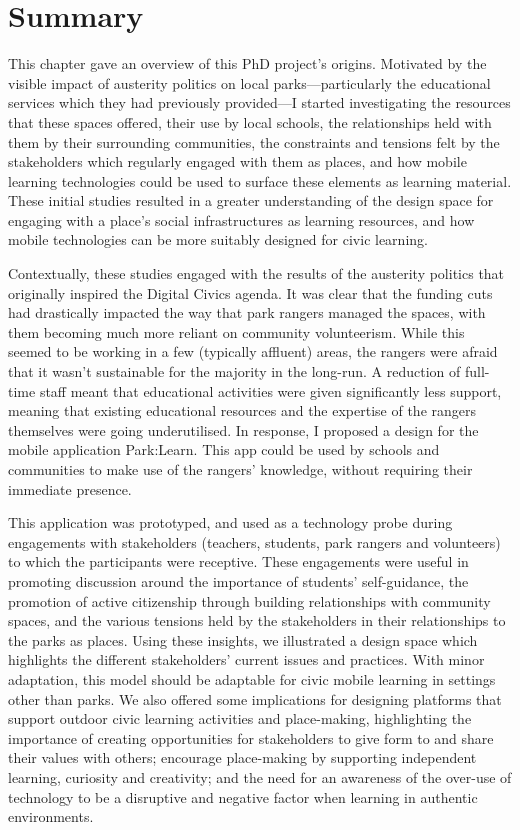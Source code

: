 \section{Summary}

This chapter gave an overview of this PhD project's origins. Motivated by the visible impact of austerity politics on local parks---particularly the educational services which they had previously provided---I started investigating the resources that these spaces offered, their use by local schools, the relationships held with them by their surrounding communities, the constraints and tensions felt by the stakeholders which regularly engaged with them as places, and how mobile learning technologies could be used to surface these elements as learning material. These initial studies resulted in a greater understanding of the design space for engaging with a place's social infrastructures as learning resources, and how mobile technologies can be more suitably designed for civic learning.

Contextually, these studies engaged with the results of the austerity politics that originally inspired the Digital Civics agenda. It was clear that the funding cuts had drastically impacted the way that park rangers managed the spaces, with them becoming much more reliant on community volunteerism. While this seemed to be working in a few (typically affluent) areas, the rangers were afraid that it wasn't sustainable for the majority in the long-run. A reduction of full-time staff meant that educational activities were given significantly less support, meaning that existing educational resources and the expertise of the rangers themselves were going underutilised. In response, I proposed a design for the mobile application Park:Learn. This app could be used by schools and communities to make use of the rangers' knowledge, without requiring their immediate presence.

This application was prototyped, and used as a technology probe during engagements with stakeholders (teachers, students, park rangers and volunteers) to which the participants were receptive. These engagements were useful in promoting discussion around the importance of students' self-guidance, the promotion of active citizenship through building relationships with community spaces, and the various tensions held by the stakeholders in their relationships to the parks as places. Using these insights, we illustrated a design space which highlights the different stakeholders’ current issues and practices. With minor adaptation, this model should be adaptable for civic mobile learning in settings other than parks. We also offered some implications for designing platforms that support outdoor civic learning activities and place-making, highlighting the importance of creating opportunities for stakeholders to give form to and share their values with others; encourage place-making by supporting independent learning, curiosity and creativity; and the need for an awareness of the over-use of technology to be a disruptive and negative factor when learning in authentic environments.

